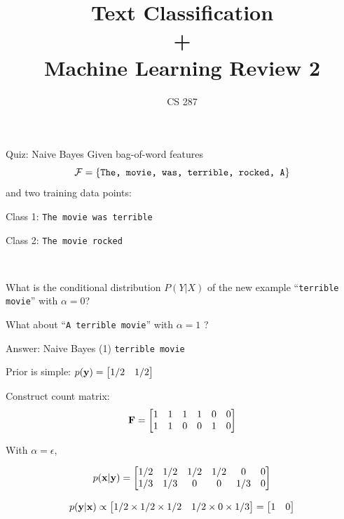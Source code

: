 \documentclass{beamer}
\title{Text Classification\\ + \\ Machine Learning Review 2 }
\date{}
\author{CS 287}
\begin{document}
\begin{frame}
  \titlepage
\end{frame}



\begin{frame}{Quiz: Naive Bayes}
  Given bag-of-word features \[\mathcal{F} = \{\mathrm{\texttt{The, movie, was, terrible, rocked, A}} \}\] and two training data points:
    
  \begin{center}
    Class 1: \texttt{The movie was terrible}
  
    Class 2: \texttt{The movie rocked}
  \end{center}
  \\

  \air 

  What is the conditional distribution $P(Y | X)$ of the new example ``\texttt{terrible movie}''  with $\alpha =0$?
  \air 

  What about ``\texttt{A terrible movie}'' with $\alpha =1$ ?
\end{frame}

\begin{frame}{Answer: Naive Bayes (1) }
  \texttt{terrible movie}
  \air 

  Prior is simple: $p(\mathbf{y}) =  \begin{bmatrix} 1/2 & 1/2 \end{bmatrix}$  

  Construct count matrix:
  \[ \mathbf{F} =
    \begin{bmatrix}
      1 & 1 & 1 & 1 & 0 & 0 \\
      1 & 1 & 0 & 0 & 1 & 0 \\
    \end{bmatrix}
  \] 
  
  With $\alpha = \epsilon$,

  \[ p(\mathbf{x} | \mathbf{y}) =     \begin{bmatrix}
      1/2 & 1/2 & 1/2 & 1/2 & 0 & 0 \\
      1/3 & 1/3 & 0 & 0 & 1/3 & 0 \\
    \end{bmatrix} 
  \]

  \[ p(\mathbf{y} | \mathbf{x}) \propto \begin{bmatrix} 1/2 \times 1/2 \times 1/2 &  1/2 \times 0 \times 1/3  \end{bmatrix} = \begin{bmatrix} 1 &  0 \end{bmatrix}  \]

\end{frame}
  
\end{document}
